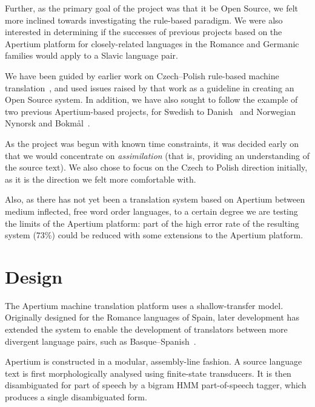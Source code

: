 \documentclass[11pt]{article}
\begin{document}
Further, as the primary goal of the project was that it be Open Source, 
we felt more inclined towards
investigating the rule-based paradigm. We were also interested
in determining if the successes of previous projects based on
the Apertium platform for closely-related languages in the Romance
and Germanic families would apply to a Slavic language 
pair. %

We have been guided by earlier work on Czech--Polish rule-based machine translation~\citep{Debowski02}, 
and used issues raised by that work as a guideline in creating an Open Source system. In addition, we 
have also sought to follow the example of two previous Apertium-based projects, for Swedish to 
Danish~\citep{tyers2009rfr} and Norwegian Nynorsk and Bokm{\aa}l~\citep{unhammer2009rfr}.

As the project was begun with known time constraints, it was decided early on that we would 
concentrate on \emph{assimilation} (that is, providing an understanding of the source text). 
We also chose to focus on the Czech to Polish direction initially, as it is the direction 
we felt more comfortable with. 

Also, as there has not yet been a translation system based on Apertium between
medium inflected, free word order languages, to a certain degree we are testing
the limits of the Apertium platform: part of the high error rate of the resulting
system (73\%) could be reduced with some extensions to the Apertium platform.

\section{Design}
The Apertium machine translation platform uses a shallow-transfer model.
Originally designed for the Romance languages of Spain, later development has
extended the system to enable the development of translators between more
divergent language pairs, such as Basque--Spanish~\citep{ginestirosell09}.

Apertium is constructed in a modular, assembly-line fashion. 
A source language text is first morphologically analysed using finite-state 
transducers. It is then disambiguated for part of speech by a bigram HMM 
part-of-speech tagger, which produces a single disambiguated form.
\end{document}
